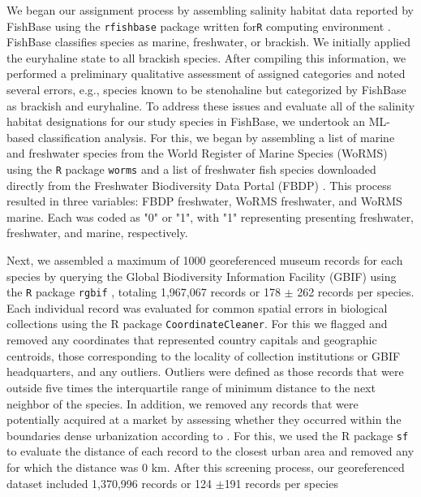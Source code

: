 \documentclass[11pt]{article}
\begin{document}
We began our assignment process by assembling salinity habitat data reported by FishBase \citep{froese2010fishbase} using the \texttt{rfishbase} package \citep{boettiger2012rfishbase} written for\texttt{R} computing environment \citep{r}. FishBase classifies species as marine, freshwater, or brackish. We initially applied the euryhaline state to all brackish species. After compiling this information, we performed a preliminary qualitative assessment of assigned categories and noted several errors, e.g., species known to be stenohaline but categorized by FishBase as brackish and euryhaline. To address these issues and evaluate all of the salinity habitat designations for our study species in FishBase, we undertook an ML-based classification analysis. For this, we began by assembling a list of marine and freshwater species from the World Register of Marine Species (WoRMS) \citep{costello2013global} using the   \texttt{R} package \texttt{worms} \citep{worms} and a list of freshwater fish species downloaded directly from the Freshwater Biodiversity Data Portal (FBDP) \citep{schmidt2019freshwater}. This process resulted in three variables: FBDP freshwater, WoRMS freshwater, and WoRMS marine. Each was coded as "0" or "1", with "1" representing presenting freshwater, freshwater, and marine, respectively. 

Next, we assembled a maximum of 1000 georeferenced museum records for each species by querying the Global Biodiversity Information Facility (GBIF) using the \texttt{R} package \texttt{rgbif} \citep{rgbif}, totaling 1,967,067 records or 178 $\pm$ 262 records per species. Each individual record was evaluated for common spatial errors in biological collections using the R package \texttt{CoordinateCleaner}. For this we flagged and removed any coordinates that represented country capitals and geographic centroids, those corresponding to the locality of collection institutions or GBIF headquarters, and any outliers. Outliers were defined as those records that were outside five times the interquartile range of minimum distance to the next neighbor of the species. In addition, we removed any records that were potentially acquired at a market by assessing whether they occurred within the boundaries dense urbanization according to \citep{patterson2012world}. For this, we used the  \textsc{R} package \texttt{sf} to evaluate the distance of each record to the closest urban area and removed any for which the distance was 0 km. After this screening process, our georeferenced dataset included 1,370,996 records or 124 $\pm $191 records per species
\end{document}
